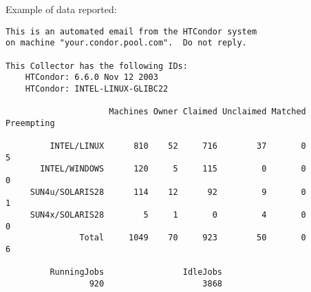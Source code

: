 Example of data reported:

\begin{verbatim}
This is an automated email from the HTCondor system
on machine "your.condor.pool.com".  Do not reply.

This Collector has the following IDs:
    HTCondor: 6.6.0 Nov 12 2003
    HTCondor: INTEL-LINUX-GLIBC22

                     Machines Owner Claimed Unclaimed Matched Preempting

         INTEL/LINUX      810    52     716        37       0          5
       INTEL/WINDOWS      120     5     115         0       0          0
     SUN4u/SOLARIS28      114    12      92         9       0          1
     SUN4x/SOLARIS28        5     1       0         4       0          0
               Total     1049    70     923        50       0          6

         RunningJobs                IdleJobs
                 920                    3868
\end{verbatim}




